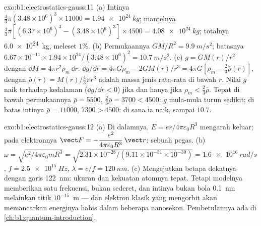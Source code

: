 \begin{solution}{exo:b1:electrostatics-gauss:11}
(a) Intinya $\tfrac43\pi(3.48 \times 10^6)^3 \times 11000 = \qty{1.94e24}{kg}$; mantelnya
$\tfrac43\pi[(6.37 \times 10^6)^3 - (3.48 \times 10^6)^3] \times 4500 = \qty{4.08e24}{kg}$;
totalnya \qty{6.0e24}{kg}, meleset $1\%$. (b) Permukaannya $GM/R^2 = \qty{9.9}{m/s^2}$;
batasnya $6.67 \times 10^{-11} \times 1.94 \times 10^{24}/(3.48 \times 10^6)^2 =
\qty{10.7}{m/s^2}$. (c) $g = GM(r)/r^2$ dengan $\dd M = 4\pi r^2\rho_m\,\dd r$:
$\dd g/\dd r = 4\pi G\rho_m - 2GM(r)/r^3 = 4\pi G[\rho_m - \tfrac23\bar\rho(r)]$,
dengan $\bar\rho(r) = M(r)/\tfrac43\pi r^3$ adalah massa jenis rata-rata di bawah $r$.
Nilai $g$ naik terhadap kedalaman ($\dd g/\dd r < 0$) jika dan hanya jika $\rho_m < \tfrac23\bar\rho$. Tepat
di bawah permukaannya $\bar\rho = 5500$, $\tfrac23\bar\rho = 3700 < 4500$: $g$
mula-mula turun sedikit; di batas intinya $\bar\rho = 11000$, $7300 >
4500$: di sana ia naik, sampai $10.7$.
\end{solution}

\begin{solution}{exo:b1:electrostatics-gauss:12}
(a) Di dalamnya, $E = er/4\pi\varepsilon_0R^3$ mengarah keluar; pada elektronnya $\vect F =
-\dfrac{e^2}{4\pi\varepsilon_0R^3}\,\vect r$: sebuah pegas. (b) $\omega = \sqrt{e^2/4\pi\varepsilon_0mR^3}
= \sqrt{2.31 \times 10^{-28}/(9.11 \times 10^{-31} \times 10^{-30})} = \qty{1.6e16}{rad/s}$,
$f = \qty{2.5e15}{Hz}$, $\lambda = c/f = \qty{120}{nm}$. (c) Mengejutkan betapa dekatnya
dengan garis \qty{122}{nm}: ukuran dan kekuatan atomnya tepat.
Tetapi modelnya memberikan satu frekuensi, bukan sederet, dan intinya
bukan bola \qty{0.1}{nm} melainkan titik $10^{-15}$~m --- dan elektron
klasik yang mengorbit akan memancarkan energinya habis dalam beberapa nanosekon. Pembetulannya
ada di \cref{ch:b1:quantum-introduction}.
\end{solution}

